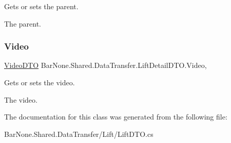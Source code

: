 Gets or sets the parent. 

The parent. \mbox{\label{class_bar_none_1_1_shared_1_1_data_transfer_1_1_lift_detail_d_t_o_a4c527455c0a6db44f0e8224cffd2e24d}} 
\subsubsection{\texorpdfstring{Video}{Video}}
{\footnotesize\ttfamily \mbox{\hyperlink{class_bar_none_1_1_shared_1_1_data_transfer_1_1_video_d_t_o}{Video\+D\+TO}} Bar\+None.\+Shared.\+Data\+Transfer.\+Lift\+Detail\+D\+T\+O.\+Video\hspace{0.3cm}{\ttfamily [get]}, {\ttfamily [set]}}



Gets or sets the video. 

The video. 

The documentation for this class was generated from the following file\+:\begin{DoxyCompactItemize}
\item 
Bar\+None.\+Shared.\+Data\+Transfer/\+Lift/Lift\+D\+T\+O.\+cs\end{DoxyCompactItemize}
